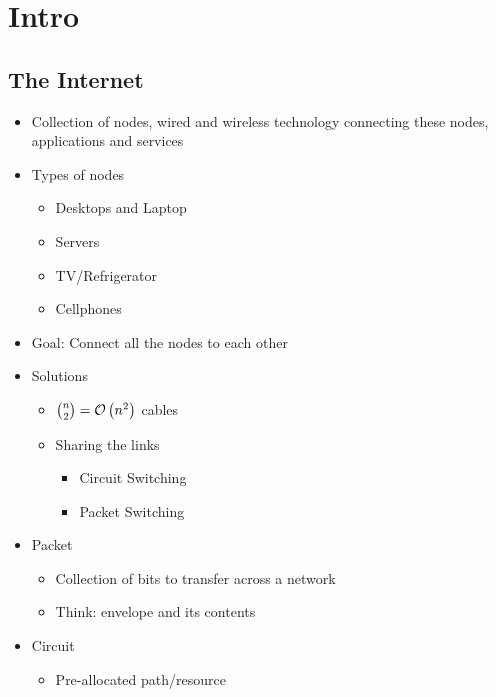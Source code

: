 \section{Intro}
\subsection{The Internet}
\begin{itemize}[nosep]
    \item Collection of nodes, wired and wireless technology connecting these nodes, applications and services
    \item Types of nodes
          \begin{itemize}[nosep]
              \item Desktops and Laptop
              \item Servers
              \item TV/Refrigerator
              \item Cellphones
          \end{itemize}
    \item Goal: Connect all the nodes to each other
    \item Solutions
          \begin{itemize}[nosep]
              \item $\binom{n}{2} = \mathcal{O}\left(n^2\right)$ cables
              \item Sharing the links
                    \begin{itemize}[nosep]
                        \item Circuit Switching
                        \item Packet Switching
                    \end{itemize}
          \end{itemize}
    \item Packet
          \begin{itemize}[nosep]
              \item Collection of bits to transfer across a network
              \item Think: envelope and its contents
          \end{itemize}
    \item Circuit
          \begin{itemize}[nosep]
              \item Pre-allocated path/resource
          \end{itemize}
\end{itemize}

